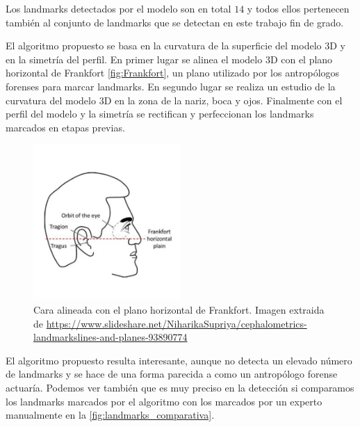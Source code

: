                \noindent Los landmarks detectados por el modelo son en total $14$ y todos ellos pertenecen también al conjunto de landmarks que se detectan en este trabajo fin de grado.

                \medskip

                \noindent El algoritmo propuesto se basa en la curvatura de la superficie del modelo $3$D y en la simetría del perfil. En primer lugar se alinea el modelo $3$D con el plano horizontal de Frankfort \autoref{fig:Frankfort}, un plano utilizado por los antropólogos forenses para marcar landmarks. En segundo lugar se realiza un estudio de la curvatura del modelo $3$D en la zona de la nariz, boca y ojos. Finalmente con el perfil del modelo y la simetría se rectifican y perfeccionan los landmarks marcados en etapas previas.

                \begin{figure}[!h]
                    \centering
                    \includegraphics[width=0.5\textwidth]{img/frankfort.png}
                    \caption{Cara alineada con el plano horizontal de Frankfort. Imagen extraida de \url{https://www.slideshare.net/NiharikaSupriya/cephalometrics-landmarkslines-and-planes-93890774
                    }}
                    \label{fig:Frankfort}
                \end{figure}

                \medskip

                \noindent El algoritmo propuesto resulta interesante, aunque no detecta un elevado número de landmarks y se hace de una forma parecida a como un antropólogo forense actuaría. Podemos ver también que es muy preciso en la detección si comparamos los landmarks marcados por el algoritmo con los marcados por un experto manualmente en la \autoref{fig:landmarks_comparativa}.


